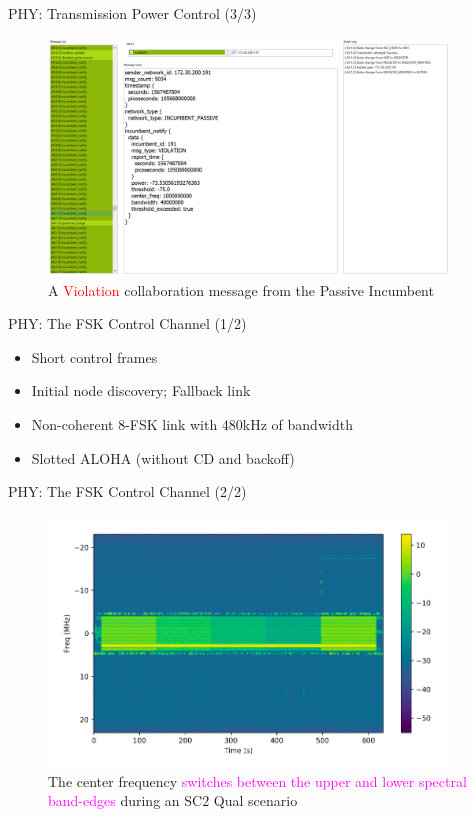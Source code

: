 \documentclass{beamer}
\begin{document}
\begin{frame}{PHY: Transmission Power Control (3/3)}
\begin{figure}
    \centering
    \includegraphics[width = 0.95\textwidth]{Passive_Incumbent_1.jpg}
    \caption{A \textcolor{red}{Violation} collaboration message from the Passive Incumbent}
    \label{fig:3}
\end{figure}
\end{frame}
\begin{frame}{PHY: The FSK Control Channel (1/2)}
    \begin{itemize}
        \item Short control frames
        \item Initial node discovery; Fallback link
        \item Non-coherent $8$-FSK link with $480$kHz of bandwidth
        \item Slotted ALOHA (without CD and backoff)
    \end{itemize}
\end{frame}
\begin{frame}{PHY: The FSK Control Channel (2/2)}
\begin{figure}
    \centering
    \includegraphics[width = 0.95\textwidth]{Control_Channels_At_Band_Edges.PNG}
    \caption{The center frequency \textcolor{magenta}{switches between the upper and lower spectral band-edges} during an SC$2$ Qual scenario}
    \label{fig:5}
\end{figure}
\end{frame}
\end{document}
